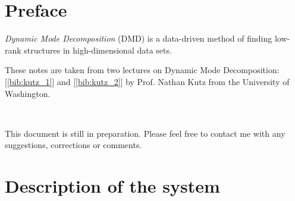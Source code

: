 \documentclass[10pt,twocolumn]{article}
\begin{document}

\setlength{\parindent}{0cm}


\section*{Preface}

\textit{Dynamic Mode Decomposition} (DMD) is a data-driven method of finding low-rank structures in high-dimensional data sets. 

These notes are taken from two lectures on Dynamic Mode Decomposition: [\ref{bib:kutz_1}] and [\ref{bib:kutz_2}] by Prof. Nathan Kutz from the University of Washington.

\,\,

This document is still in preparation. Please feel free to contact me with any suggestions, corrections or comments.

\tableofcontents


\vspace{10mm}


\section{Description of the system}
\end{document}
